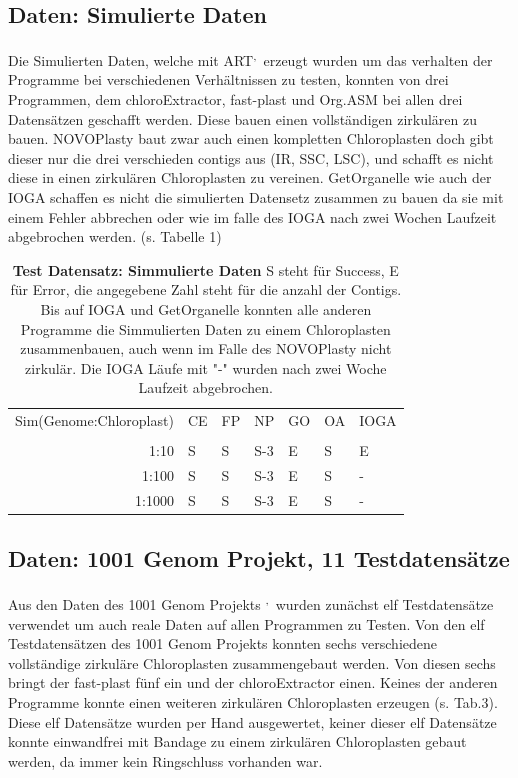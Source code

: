 \documentclass{scrartcl}
\begin{document}
\subsection{Daten: Simulierte Daten}
\label{sec-3-2}
Die Simulierten Daten, welche mit ART\footnotemark[35]{}\textsuperscript{,}\,\footnotemark[36]{} erzeugt wurden um das verhalten der Programme bei verschiedenen Verhältnissen zu testen, konnten von drei Programmen, dem chloroExtractor, fast-plast und Org.ASM 
bei allen drei Datensätzen geschafft werden. Diese bauen einen vollständigen zirkulären zu bauen. NOVOPlasty baut zwar auch einen kompletten Chloroplasten doch gibt dieser 
nur die drei verschieden contigs aus (IR, SSC, LSC), und schafft es nicht diese in einen zirkulären Chloroplasten zu vereinen. GetOrganelle wie auch der IOGA schaffen es nicht die
simulierten Datensetz zusammen zu bauen da sie mit einem Fehler abbrechen oder wie im falle des IOGA nach zwei Wochen Laufzeit abgebrochen werden. (s. Tabelle 1) 

\begin{table}[!h]
\caption[Test Datensatz: Simmulierte Daten]{\textbf{Test Datensatz: Simmulierte Daten} S steht für Success, E für Error, die angegebene Zahl steht für die anzahl der Contigs. Bis auf IOGA und GetOrganelle konnten alle anderen Programme die Simmulierten Daten zu einem Chloroplasten zusammenbauen, auch wenn im Falle des NOVOPlasty nicht zirkulär. Die IOGA Läufe mit "-" wurden nach zwei Woche Laufzeit abgebrochen.}
\begin{center}
\begin{tabular}{rllllll}
Sim(Genome:Chloroplast) & CE & FP & NP & GO & OA & IOGA\\
 &  &  &  &  &  & \\
\hline
1:10 & S & S & S-3 & E & S & E\\
1:100 & S & S & S-3 & E & S & -\\
1:1000 & S & S & S-3 & E & S & -\\
\end{tabular}
\end{center}
\end{table}

\subsection{Daten: 1001 Genom Projekt, 11 Testdatensätze}
\label{sec-3-3}
Aus den Daten des 1001 Genom Projekts \footnotemark[32]{}\textsuperscript{,}\,\footnotemark[33]{} wurden zunächst elf Testdatensätze verwendet um auch reale Daten auf allen Programmen zu Testen.
Von den elf Testdatensätzen des 1001 Genom Projekts konnten sechs verschiedene vollständige zirkuläre Chloroplasten zusammengebaut werden. Von diesen
sechs bringt der fast-plast fünf ein und der chloroExtractor einen. Keines der anderen Programme konnte einen weiteren 
zirkulären Chloroplasten erzeugen (s. Tab.3). Diese elf Datensätze wurden per Hand ausgewertet, keiner dieser elf Datensätze konnte einwandfrei mit Bandage
zu einem zirkulären Chloroplasten gebaut werden, da immer kein Ringschluss vorhanden war.
\end{document}
